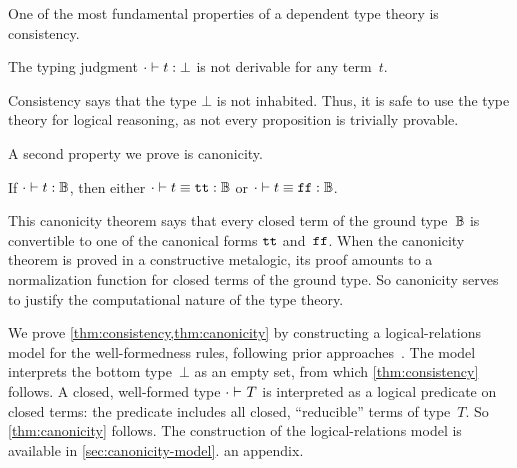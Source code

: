 One of the most fundamental properties of a dependent type theory is consistency.
\begin{theorem}[Consistency]
\label{thm:consistency}
  The typing judgment $ {\cdot} \vdash {t} : {\bot} $ is not derivable for any term~$t$.
\end{theorem}

\noindent
Consistency says that the type $\bot$ is not inhabited.
Thus, it is safe to use the type theory for logical reasoning, as not
every proposition is trivially provable.


A second property we prove is canonicity.

\begin{theorem}[Canonicity]
\label{thm:canonicity}
  If $ {\cdot} \vdash {t} : {\mathbb{B}} $, then either $ {\cdot} \vdash {t \equiv \ensuremath{\texttt{tt}}} : {\mathbb{B}} $ or $ {\cdot} \vdash {t \equiv \ensuremath{\texttt{ff}}} : {\mathbb{B}} $.
\end{theorem}

\noindent
This canonicity theorem says that every closed term of the ground
type~$\mathbb{B}$ is convertible to one of the canonical forms $\texttt{tt}$ and~$\texttt{ff}$.
When the canonicity theorem is proved in a constructive meta\-logic, its proof
amounts to a normalization function for closed terms of the ground type.
So canonicity serves to justify the computational nature of the type theory.

We prove \cref{thm:consistency,thm:canonicity} by constructing a logical-relations model
for the well-formedness rules, following prior approaches~\cite{coquand2018canonicity,kaposi2019gluing,sterling2019algebraic}.
%
The model interprets the bottom type~$\bot$ as an empty set, from which
\cref{thm:consistency} follows.
A closed, well-formed type $ {\cdot} \vdash_{} {T} $ is interpreted as
a logical predicate on closed terms: the predicate includes all
closed, ``reducible'' terms of type~$T$. So \cref{thm:canonicity} follows.
The construction of the logical-relations model is available in
\ifreport
\cref{sec:canonicity-model}.
\else
an appendix.
\fi{}